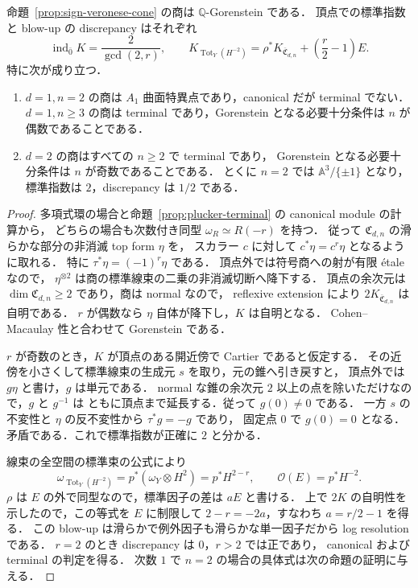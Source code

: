 \begin{theorem}
\label{thm:sign-quotient-index}
命題~\ref{prop:sign-veronese-cone} の商は $\mathbb Q$-Gorenstein である．
頂点での標準指数と blow-up の discrepancy はそれぞれ
\[
 \operatorname{ind}_{\bar0}K
 =\frac{2}{\gcd(2,r)},\qquad
 K_{\operatorname{Tot}_Y(H^{-2})}
 =\rho^*K_{\overline{\mathfrak C}_{d,n}}
   +\left(\frac r2-1\right)E.
\]
特に次が成り立つ．
\begin{enumerate}
\item $d=1,n=2$ の商は $A_1$ 曲面特異点であり，canonical だが terminal でない．
$d=1,n\geq3$ の商は terminal であり，Gorenstein となる必要十分条件は
$n$ が偶数であることである．
\item $d=2$ の商はすべての $n\geq2$ で terminal であり，
Gorenstein となる必要十分条件は $n$ が奇数であることである．
とくに $n=2$ では $\mathbb A^3/\{\pm1\}$ となり，
標準指数は $2$，discrepancy は $1/2$ である．
\end{enumerate}
\end{theorem}
\begin{proof}
多項式環の場合と命題~\ref{prop:plucker-terminal} の canonical module の計算から，
どちらの場合も次数付き同型 $\omega_R\simeq R(-r)$ を持つ．
従って $\mathfrak C_{d,n}$ の滑らかな部分の非消滅 top form $\eta$ を，
スカラー $c$ に対して $c^*\eta=c^r\eta$ となるように取れる．
特に $\tau^*\eta=(-1)^r\eta$ である．
頂点外では符号商への射が有限 \'{e}tale なので，
$\eta^{\otimes2}$ は商の標準線束の二乗の非消滅切断へ降下する．
頂点の余次元は $\dim\mathfrak C_{d,n}\geq2$ であり，商は normal なので，
reflexive extension により $2K_{\overline{\mathfrak C}_{d,n}}$ は自明である．
$r$ が偶数なら $\eta$ 自体が降下し，$K$ は自明となる．
Cohen--Macaulay 性と合わせて Gorenstein である．

$r$ が奇数のとき，$K$ が頂点のある開近傍で Cartier であると仮定する．
その近傍を小さくして標準線束の生成元 $s$ を取り，元の錐へ引き戻すと，
頂点外では $g\eta$ と書け，$g$ は単元である．
normal な錐の余次元 $2$ 以上の点を除いただけなので，$g$ と $g^{-1}$ は
ともに頂点まで延長する．従って $g(0)\ne0$ である．
一方 $s$ の不変性と $\eta$ の反不変性から $\tau^*g=-g$ であり，
固定点 $0$ で $g(0)=0$ となる．矛盾である．これで標準指数が正確に $2$ と分かる．

線束の全空間の標準束の公式により
\[
 \omega_{\operatorname{Tot}_Y(H^{-2})}=p^*(\omega_Y\otimes H^2)
 =p^*H^{2-r},\qquad
 \mathcal O(E)=p^*H^{-2}.
\]
$\rho$ は $E$ の外で同型なので，標準因子の差は $aE$ と書ける．
上で $2K$ の自明性を示したので，この等式を $E$ に制限して
$2-r=-2a$，すなわち $a=r/2-1$ を得る．
この blow-up は滑らかで例外因子も滑らかな単一因子だから log resolution である．
$r=2$ のとき discrepancy は $0$，$r>2$ では正であり，
canonical および terminal の判定を得る．
次数 $1$ で $n=2$ の場合の具体式は次の命題の証明に与える．
\end{proof}

